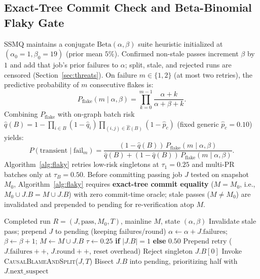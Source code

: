 \subsection{Exact-Tree Commit Check and Beta-Binomial Flaky Gate}
SSMQ maintains a conjugate $\mathrm{Beta}(\alpha,\beta)$ suite heuristic initialized at $(\alpha_0{=}1, \beta_0{=}19)$ (prior mean $5\%$). Confirmed non-stale passes increment $\beta$ by $1$ and add that job's prior failures to $\alpha$; split, stale, and rejected runs are censored (Section~\ref{sec:threats}). On failure $m \in \{1, 2\}$ (at most two retries), the predictive probability of $m$ consecutive flakes is:
\begin{equation}
P_{\text{flake}}(m \mid \alpha, \beta) = \prod_{k=0}^{m-1} \frac{\alpha + k}{\alpha + \beta + k}.
\label{eq:betabinom}
\end{equation}
Combining $P_{\text{flake}}$ with on-graph batch risk $\hat{q}(B)=1-\prod_{i\in B}(1-\hat{q}_i)\prod_{(i,j)\in\hat{E}(B)}(1-\hat{p}_c)$ (fixed generic $\hat{p}_c=0.10$) yields:
\begin{equation}
P(\text{transient} \mid \text{fail}_m) = \frac{(1 - \hat{q}(B))\, P_{\text{flake}}(m \mid \alpha, \beta)}{\hat{q}(B) + (1 - \hat{q}(B))\, P_{\text{flake}}(m \mid \alpha, \beta)}.
\label{eq:posterior}
\end{equation}
Algorithm~\ref{alg:flaky} retries low-risk singletons at $\tau_1{=}0.25$ and multi-PR batches only at $\tau_B{=}0.50$. Before committing passing job $J$ tested on snapshot $M_0$, Algorithm~\ref{alg:flaky} requires \textbf{exact-tree commit equality} ($M{=}M_0$, i.e., $M_0 \cup J.B = M \cup J.B$) with zero commit-time oracle; stale passes ($M{\neq}M_0$) are invalidated and prepended to pending for re-verification atop $M$.

\begin{algorithm}[t]
\caption{Exact-Tree Commit Check \& Two-Regime Flaky Gate}
\label{alg:flaky}
\begin{algorithmic}[1]
\REQUIRE Completed run $R = (J, \text{pass}, M_0, T)$, mainline $M$, state $(\alpha, \beta)$
        \STATE Invalidate stale pass; prepend $J$ to pending (keeping failures/round)
        \RETURN
    \ENDIF
    \STATE $\alpha \leftarrow \alpha + J.\text{failures}$; \quad $\beta \leftarrow \beta + 1$; \quad $M \leftarrow M \cup J.B$
\ELSE
    \STATE $\tau \leftarrow 0.25$ \textbf{if} $|J.B| = 1$ \textbf{else} $0.50$
        \STATE Prepend retry ($J.\text{failures}{+}{+}$, $J.\text{round}{+}{+}$, reset overhead)
        \STATE Reject singleton $J.B[0]$
        \STATE Invoke \textsc{CausalBlameAndSplit}($J, T$) 
    \ELSE
        \STATE Bisect $J.B$ into pending, prioritizing half with $J.\text{next\_suspect}$
    \ENDIF
\ENDIF
\end{algorithmic}
\end{algorithm}


